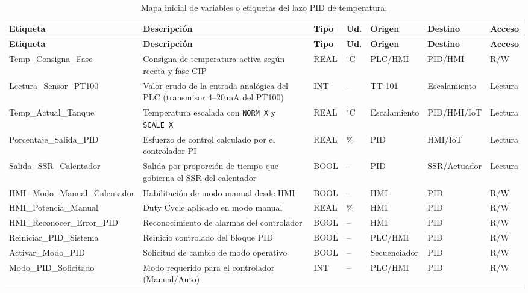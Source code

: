 \begin{small}
\begin{longtable}{L{3.2cm}L{3.5cm}L{1.0cm}L{0.8cm}L{1.8cm}L{1.8cm}L{1.1cm}}
\caption{Mapa inicial de variables o etiquetas del lazo PID de temperatura.} \label{tab:tags_pid}\\
\toprule
\textbf{Etiqueta} & \textbf{Descripción} & \textbf{Tipo} & \textbf{Ud.} & \textbf{Origen} & \textbf{Destino} & \textbf{Acceso} \\
\midrule
\endfirsthead
\toprule
\textbf{Etiqueta} & \textbf{Descripción} & \textbf{Tipo} & \textbf{Ud.} & \textbf{Origen} & \textbf{Destino} & \textbf{Acceso} \\
\midrule
\endhead
Temp\_\allowbreak Consigna\_\allowbreak Fase & Consigna de temperatura activa según receta y fase CIP & REAL & $^\circ$C & PLC/HMI & PID/HMI & R/W \\
Lectura\_\allowbreak Sensor\_\allowbreak PT100 & Valor crudo de la entrada analógica del PLC (transmisor 4--20\,mA del PT100) & INT & -- & TT-101 & Escalamiento & Lectura \\
Temp\_\allowbreak Actual\_\allowbreak Tanque & Temperatura escalada con \texttt{NORM\_X} y \texttt{SCALE\_X} & REAL & $^\circ$C & Escalamiento & PID/HMI/IoT & Lectura \\
Porcentaje\_\allowbreak Salida\_\allowbreak PID & Esfuerzo de control calculado por el controlador PI & REAL & \% & PID & HMI/IoT & Lectura \\
Salida\_\allowbreak SSR\_\allowbreak Calentador & Salida por proporción de tiempo que gobierna el SSR del calentador & BOOL & -- & PID & SSR/Actuador & Lectura \\
HMI\_\allowbreak Modo\_\allowbreak Manual\_\allowbreak Calentador & Habilitación de modo manual desde HMI & BOOL & -- & HMI & PID & R/W \\
HMI\_\allowbreak Potencia\_\allowbreak Manual & Duty Cycle aplicado en modo manual & REAL & \% & HMI & PID & R/W \\
HMI\_\allowbreak Reconocer\_\allowbreak Error\_\allowbreak PID & Reconocimiento de alarmas del controlador & BOOL & -- & HMI & PID & R/W \\
Reiniciar\_\allowbreak PID\_\allowbreak Sistema & Reinicio controlado del bloque PID & BOOL & -- & PLC/HMI & PID & R/W \\
Activar\_\allowbreak Modo\_\allowbreak PID & Solicitud de cambio de modo operativo & BOOL & -- & Secuenciador & PID & R/W \\
Modo\_\allowbreak PID\_\allowbreak Solicitado & Modo requerido para el controlador (Manual/Auto) & INT & -- & PLC/HMI & PID & R/W \\

\end{longtable}
\end{small}
